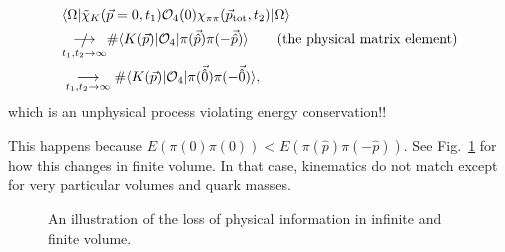 \begin{align}
    &\langle \Omega | \tilde{\chi}_K(\vec{p} = 0, t_1) {\cal O}_4(0) \chi_{\pi \pi}(\vec{p}_\text{tot}, t_2) | \Omega \rangle \nonumber \\
    &\underset{t_1,t_2 \to \infty}{\slashed\longrightarrow} \# \langle K (\vec{p}) | {\cal O}_4 | \pi(\vec{\hat{p}})\pi(-\vec{\hat{p}}) \rangle \qquad \text{(the physical matrix element)} \nonumber \\
    &\underset{t_1,t_2 \to \infty}{\longrightarrow} \# \langle K (\vec{p}) | {\cal O}_4 | \pi(\vec{\hat{0}})\pi(-\vec{\hat{0}}) \rangle,
\end{align}
which is an unphysical process violating energy conservation!! 

This happens because $E(\pi(0) \pi(0)) < E(\pi(\hat{p})\pi(-\hat{p}))$.
See Fig.~\ref{fig:FVKpipi} for how this changes in finite volume. In that case, kinematics do not match except for very particular volumes and quark masses.

\begin{figure}
\caption{An illustration of the loss of physical information in infinite and finite volume.
\label{fig:FVKpipi}}
\end{figure}


